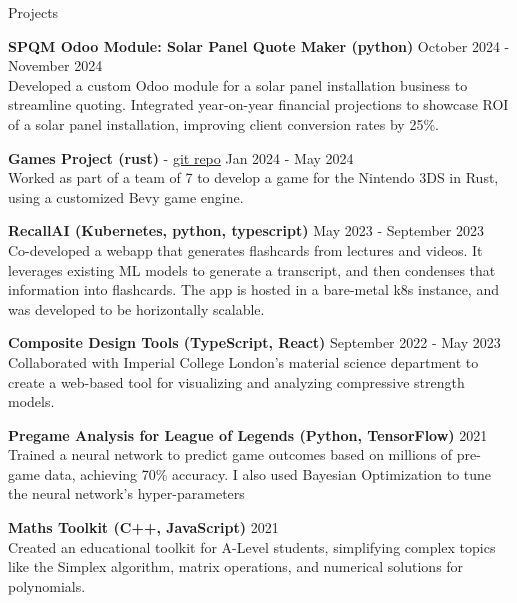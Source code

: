 \documentclass{resume} %
\begin{document}
\begin{rSection}{Projects}
\vspace{-1.25em}

\item \textbf{SPQM Odoo Module: Solar Panel Quote Maker (python)} \hfill October 2024 - November 2024 \\
Developed a custom Odoo module for a solar panel installation business to streamline quoting. Integrated year-on-year financial projections to showcase ROI of a solar panel installation, improving client conversion rates by 25\%. 

\item \textbf{Games Project (rust)} - \href{https://github.com/Team-Yarg/these\_times\_of\_mine}{git repo} \hfill Jan 2024 - May 2024 \\
Worked as part of a team of 7 to develop a game for the Nintendo 3DS in Rust, using a customized Bevy game engine.

\item \textbf{RecallAI (Kubernetes, python, typescript)} \hfill May 2023 - September 2023 \\
Co-developed a webapp that generates flashcards from lectures and videos. It leverages existing ML models to generate a transcript, and then condenses that information into flashcards. The app is hosted in a bare-metal k8s instance, and was developed to be horizontally scalable.

\item \textbf{Composite Design Tools (TypeScript, React)} \hfill September 2022 - May 2023 \\
Collaborated with Imperial College London's material science department to create a web-based tool for visualizing and analyzing compressive strength models.

\item \textbf{Pregame Analysis for League of Legends (Python, TensorFlow)} \hfill 2021 \\
Trained a neural network to predict game outcomes based on millions of pre-game data, achieving 70\% accuracy. I also used Bayesian Optimization to tune the neural network's hyper-parameters

\item \textbf{Maths Toolkit (C++, JavaScript)} \hfill 2021 \\
Created an educational toolkit for A-Level students, simplifying complex topics like the Simplex algorithm, matrix operations, and numerical solutions for polynomials.

\end{rSection}
\end{document}
